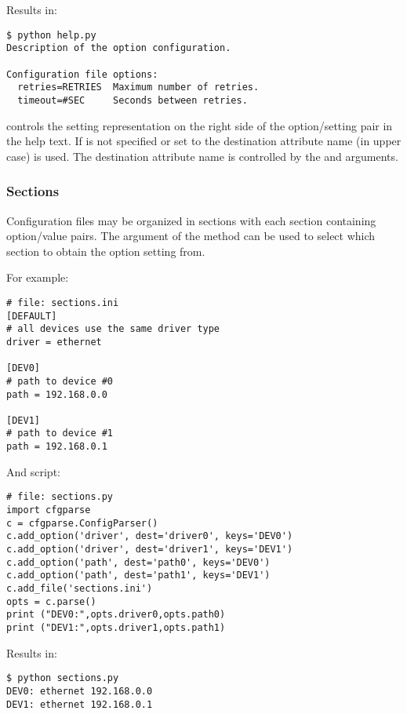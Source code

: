 \documentclass{howto}
\begin{document}
Results in:
\begin{verbatim}
$ python help.py
Description of the option configuration.

Configuration file options:
  retries=RETRIES  Maximum number of retries.
  timeout=#SEC     Seconds between retries.
\end{verbatim}

 controls the setting representation on the right side of the 
option/setting pair in the help text.  If  is not specified or
set to  the destination attribute name (in upper case) is used.
The destination attribute name is controlled by the  and 
 arguments.

\subsubsection{Sections}

Configuration files may be organized in sections with each section containing
option/value pairs.  The  argument of the  method
can be used to select which section to obtain the option setting from.

For example:

\begin{verbatim}
# file: sections.ini
[DEFAULT]
# all devices use the same driver type
driver = ethernet

[DEV0]
# path to device #0
path = 192.168.0.0

[DEV1]
# path to device #1
path = 192.168.0.1
\end{verbatim}

And script:

\begin{verbatim}
# file: sections.py
import cfgparse
c = cfgparse.ConfigParser()
c.add_option('driver', dest='driver0', keys='DEV0')
c.add_option('driver', dest='driver1', keys='DEV1')
c.add_option('path', dest='path0', keys='DEV0')
c.add_option('path', dest='path1', keys='DEV1')
c.add_file('sections.ini')
opts = c.parse()
print ("DEV0:",opts.driver0,opts.path0)
print ("DEV1:",opts.driver1,opts.path1)
\end{verbatim}

Results in:
\begin{verbatim}
$ python sections.py
DEV0: ethernet 192.168.0.0
DEV1: ethernet 192.168.0.1
\end{verbatim}
\end{document}
